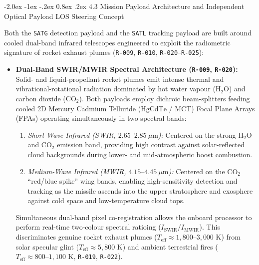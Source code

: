 \documentclass[11pt,a4paper]{article}
\makeatletter
\renewcommand\subsubsection{\@startsection{subsubsection}{3}{\z@}%
    {-2.0ex \@plus -1ex \@minus -.2ex}%
    {0.8ex \@plus .2ex}%
    {\normalfont\normalsize\bfseries\sffamily\color{SubHeadingBlue}}}
\providecommand{\abbr}[1]{#1}
\makeatother
\begin{document}
\subsubsection{4.3 Mission Payload Architecture and Independent Optical Payload LOS Steering Concept}

Both the \texttt{SATG} detection payload and the \texttt{SATL} tracking payload are built around cooled dual-band infrared telescopes engineered to exploit the radiometric signature of rocket exhaust plumes (\texttt{R-009}, \texttt{R-010}, \texttt{R-020}--\texttt{R-025}):
\begin{itemize}
    \item \textbf{Dual-Band \abbr{SWIR}/\abbr{MWIR} Spectral Architecture (\texttt{R-009}, \texttt{R-020}):} Solid- and liquid-propellant rocket plumes emit intense thermal and vibrational-rotational radiation dominated by hot water vapour ($\mathrm{H_2O}$) and carbon dioxide ($\mathrm{CO_2}$). Both payloads employ dichroic beam-splitters feeding cooled 2D Mercury Cadmium Telluride ($\mathrm{HgCdTe}$ / \abbr{MCT}) Focal Plane Arrays (\abbr{FPA}s) operating simultaneously in two spectral bands:
    \begin{enumerate}
        \item \emph{Short-Wave Infrared (\abbr{SWIR}, $2.65\text{--}2.85~\mu\mathrm{m}$):} Centered on the strong $\mathrm{H_2O}$ and $\mathrm{CO_2}$ emission band, providing high contrast against solar-reflected cloud backgrounds during lower- and mid-atmospheric boost combustion.
        \item \emph{Medium-Wave Infrared (\abbr{MWIR}, $4.15\text{--}4.45~\mu\mathrm{m}$):} Centered on the $\mathrm{CO_2}$ ``red/blue spike'' wing bands, enabling high-sensitivity detection and tracking as the missile ascends into the upper stratosphere and exosphere against cold space and low-temperature cloud tops.
    \end{enumerate}
    Simultaneous dual-band pixel co-registration allows the onboard processor to perform real-time two-colour spectral ratioing ($I_{\text{SWIR}}/I_{\text{MWIR}}$). This discriminates genuine rocket exhaust plumes ($T_{\text{eff}} \approx 1{,}800\text{--}3{,}000\text{ K}$) from solar specular glint ($T_{\text{eff}} \approx 5{,}800\text{ K}$) and ambient terrestrial fires ($T_{\text{eff}} \approx 800\text{--}1{,}100\text{ K}$, \texttt{R-019}, \texttt{R-022}).

\end{itemize}
\end{document}

